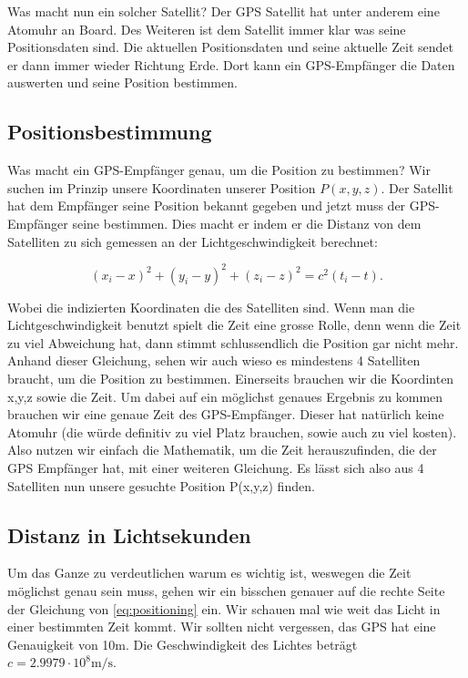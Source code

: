 \begin{refsection}
Was macht nun ein solcher Satellit? Der GPS Satellit hat unter anderem eine Atomuhr an Board. Des Weiteren ist dem Satellit immer klar was seine Positionsdaten sind. Die aktuellen Positionsdaten und seine aktuelle Zeit sendet er dann immer wieder Richtung Erde. Dort kann ein GPS-Empfänger die Daten auswerten und seine Position bestimmen.

\subsection{Positionsbestimmung}
Was macht ein GPS-Empfänger genau, um die Position zu bestimmen? Wir suchen im Prinzip unsere Koordinaten unserer Position $P(x,y,z)$. Der Satellit hat dem Empfänger seine Position bekannt gegeben und jetzt muss der GPS-Empfänger seine bestimmen. Dies macht er indem er die Distanz von dem Satelliten zu sich gemessen an der Lichtgeschwindigkeit berechnet:

\begin{equation}
\label{eq:positioning}
    (x_i-x)^2 + (y_i-y)^2 + (z_i-z)^2 = c^2 (t_i -t).
\end{equation}

\noindent{}Wobei die indizierten Koordinaten die des Satelliten sind. Wenn man die Lichtgeschwindigkeit benutzt spielt die Zeit eine grosse Rolle, denn wenn die Zeit zu viel Abweichung hat, dann stimmt schlussendlich die Position gar nicht mehr. Anhand dieser Gleichung, sehen wir auch wieso es mindestens 4 Satelliten braucht, um die Position zu bestimmen. Einerseits brauchen wir die Koordinten x,y,z sowie die Zeit. Um dabei auf ein möglichst genaues Ergebnis zu kommen brauchen wir eine genaue Zeit des GPS-Empfänger. Dieser hat natürlich keine Atomuhr (die würde definitiv zu viel Platz brauchen, sowie auch zu viel kosten). Also nutzen wir einfach die Mathematik, um die Zeit herauszufinden, die der GPS Empfänger hat, mit einer weiteren Gleichung. Es lässt sich also aus 4 Satelliten nun unsere gesuchte Position P(x,y,z) finden. 

\subsection{Distanz in Lichtsekunden}
Um das Ganze zu verdeutlichen warum es wichtig ist, weswegen die Zeit möglichst genau sein muss, gehen wir ein bisschen genauer auf die rechte Seite der Gleichung von \ref{eq:positioning} ein. Wir schauen mal wie weit das Licht in einer bestimmten Zeit kommt. Wir sollten nicht vergessen, das GPS hat eine Genauigkeit von 10m. Die Geschwindigkeit des Lichtes beträgt  \(c = 2.9979 \cdot 10^8 \text{m/s}\). \\


\end{refsection}
